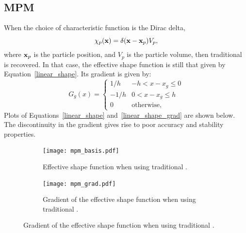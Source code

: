 \subsection{MPM}
When the choice of characteristic function is the Dirac delta,
\begin{equation}\label{MPM_char}
\chi_p(\mathbf{x}) = \delta(\mathbf{x}-\mathbf{x}_p)V_p , 
\end{equation}
where $\mathbf{x}_p$ is the particle position, and $V_p$ is the particle volume,
then traditional \MPM is recovered.  In that case, the effective shape function
is still that given by Equation~\eqref{linear_shape}.  Its gradient is given by:
\begin{equation} \label{linear_shape_grad}
G_g\left(x\right) = \begin{cases} {1 / h} & {-h < x-x_g \le 0} \\
                    {-1 / h} & {0  < x-x_g \le h} \\
                    0 & \text{otherwise},
       \end{cases}
\end{equation}
Plots of Equations~\ref{linear_shape} and~\ref{linear_shape_grad} are shown
below.  The discontinuity in the gradient gives rise to poor accuracy and
stability properties.
\begin{figure}[htbp!]
  \begin{subfigure}[t]{0.5\textwidth}
    \centering
    \texttt{[image: mpm\_basis.pdf]}
    \caption{Effective shape function when using traditional \MPM.}
  \end{subfigure}
  \begin{subfigure}[t]{0.5\textwidth}
    \centering
    \texttt{[image: mpm\_grad.pdf]}
    \caption{Gradient of the effective shape function when using traditional \MPM.}
  \end{subfigure}
  \label{Fig:MPMShape}
\end{figure}

